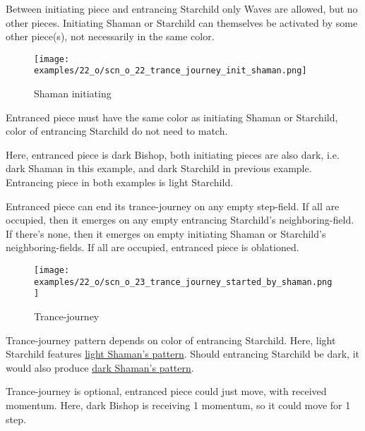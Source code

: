 Between initiating piece and entrancing Starchild only Waves are allowed, but no
other pieces. Initiating Shaman or Starchild can themselves be activated by some
other piece(s), not necessarily in the same color.

\vspace*{-0.3\baselineskip}
\noindent
\begin{wrapfigure}[10]{l}{0.4\textwidth}
\centering
\texttt{[image: examples/22\_o/scn\_o\_22\_trance\_journey\_init\_shaman.png]}
\caption{Shaman initiating}
\label{fig:scn_o_22_trance_journey_init_shaman}
\end{wrapfigure}
Entranced piece must have the same color as initiating Shaman or Starchild, color
of entrancing Starchild do not need to match.

Here, entranced piece is dark Bishop, both initiating pieces are also dark, i.e.
dark Shaman in this example, and dark Starchild in previous example. Entrancing
piece in both examples is light Starchild.

Entranced piece can end its trance-journey on any empty step-field. If all are
occupied, then it emerges on any empty entrancing Starchild's neighboring-field.
If there's none, then it emerges on empty initiating Shaman or Starchild's
neighboring-fields. If all are occupied, entranced piece is oblationed.

\clearpage %

\vspace*{-2.1\baselineskip}
\noindent
\begin{figure}[!h]
\texttt{[image: examples/22\_o/scn\_o\_23\_trance\_journey\_started\_by\_shaman.png]}
\caption{Trance-journey}
\label{fig:scn_o_23_trance_journey_started_by_shaman}
\end{figure}

Trance-journey pattern depends on color of entrancing Starchild. Here, light Starchild
features \hyperref[fig:scn_cot_14_light_shaman_trance_journey]{light Shaman's pattern}.
Should entrancing Starchild be dark, it would also produce
\hyperref[fig:scn_cot_16_dark_shaman_trance_journey]{dark Shaman's pattern}.

Trance-journey is optional, entranced piece could just move, with received momentum.
Here, dark Bishop is receiving 1 momentum, so it could move for 1 step.

